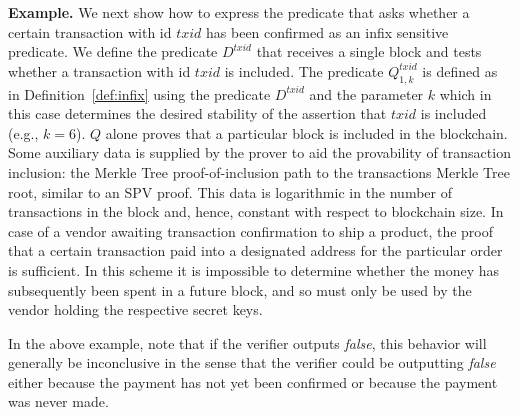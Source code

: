 \noindent\textbf{Example.}
We next show how to express the predicate that asks whether a certain
transaction with id $txid$ has been confirmed as an infix sensitive predicate.
We define the predicate $D^{txid}$ that receives a single block and tests
whether a transaction with id $txid$ is included. The predicate $Q^{txid}_{1,
k}$ is defined as in Definition~\ref{def:infix} using the predicate $D^{txid}$
and the parameter $k$ which in this case determines the desired stability of the
assertion that $txid$ is included (e.g., $k = 6$). $Q$ alone proves that a
particular block is included in the blockchain. Some auxiliary data is supplied
by the prover to aid the provability of transaction inclusion: the Merkle Tree
proof-of-inclusion path to the transactions Merkle Tree root, similar to an SPV
proof. This data is logarithmic in the number of transactions in the block and,
hence, constant with respect to blockchain size. In case of a vendor awaiting
transaction confirmation to ship a product, the proof that a certain transaction
paid into a designated address for the particular order is sufficient. In this
scheme it is impossible to determine whether the money has subsequently been
spent in a future block, and so must only be used by the vendor holding the
respective secret keys.

In the above example, note that if the verifier outputs \emph{false}, this
behavior will generally be inconclusive in the sense that the verifier could be
outputting \emph{false} either because the payment has not yet been confirmed or
because the payment was never made.

